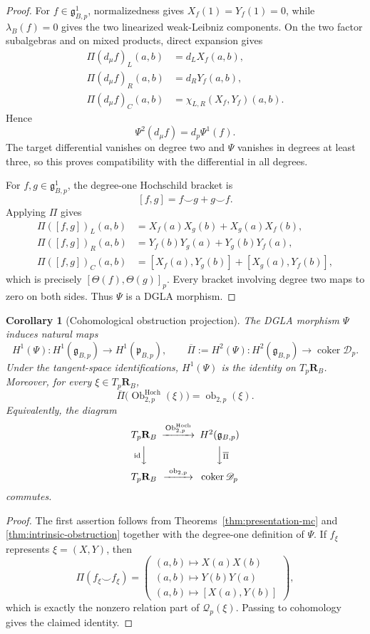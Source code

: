 \documentclass[11pt]{amsart}
\newtheorem{corollary}[theorem]{Corollary}
\newcommand{\coker}{\operatorname{coker}}
\newcommand{\cD}{\mathscr D}
\newcommand{\cQ}{\mathscr Q}
\newcommand{\gpres}{\mathfrak p}
\newcommand{\ghoch}{\mathfrak g}
\begin{document}
\begin{proof}
For $f\in\ghoch^1_{B,p}$, normalizedness gives $X_f(1)=Y_f(1)=0$, while $\lambda_B(f)=0$ gives the two linearized weak-Leibniz components.  On the two factor subalgebras and on mixed products, direct expansion gives
\begin{align*}
\Pi(d_\mu f)_L(a,b)&=d_LX_f(a,b),\\
\Pi(d_\mu f)_R(a,b)&=d_RY_f(a,b),\\
\Pi(d_\mu f)_C(a,b)&=\chi_{L,R}(X_f,Y_f)(a,b).
\end{align*}
Hence
\[
\Psi^2(d_\mu f)=d_p\Psi^1(f).
\]
The target differential vanishes on degree two and $\Psi$ vanishes in degrees at least three, so this proves compatibility with the differential in all degrees.

For $f,g\in\ghoch^1_{B,p}$, the degree-one Hochschild bracket is
\[
[f,g]=f\smile g+g\smile f.
\]
Applying $\Pi$ gives
\begin{align*}
\Pi([f,g])_L(a,b)
&=X_f(a)X_g(b)+X_g(a)X_f(b),\\
\Pi([f,g])_R(a,b)
&=Y_f(b)Y_g(a)+Y_g(b)Y_f(a),\\
\Pi([f,g])_C(a,b)
&=[X_f(a),Y_g(b)]+[X_g(a),Y_f(b)],
\end{align*}
which is precisely $[\Theta(f),\Theta(g)]_p$.  Every bracket involving degree two maps to zero on both sides.  Thus $\Psi$ is a DGLA morphism.
\end{proof}

\begin{corollary}[Cohomological obstruction projection]\label{cor:cohomological-projection}
The DGLA morphism $\Psi$ induces natural maps
\[
H^1(\Psi):H^1(\ghoch_{B,p})\longrightarrow H^1(\gpres_{B,p}),
\qquad
\overline\Pi:=H^2(\Psi):H^2(\ghoch_{B,p})\longrightarrow\coker\cD_p.
\]
Under the tangent-space identifications, $H^1(\Psi)$ is the identity on $T_p\mathbf R_B$.  Moreover, for every $\xi\in T_p\mathbf R_B$,
\[
\boxed{
\overline\Pi\bigl(\operatorname{Ob}^{\mathrm{Hoch}}_{2,p}(\xi)\bigr)
=
\operatorname{ob}_{2,p}(\xi).
}
\]
Equivalently, the diagram
\[
\begin{CD}
T_p\mathbf R_B @>{\operatorname{Ob}^{\mathrm{Hoch}}_{2,p}}>> H^2(\ghoch_{B,p})\\
@V{\mathrm{id}}VV @VV{\overline\Pi}V\\
T_p\mathbf R_B @>{\operatorname{ob}_{2,p}}>> \coker\cD_p
\end{CD}
\]
commutes.
\end{corollary}

\begin{proof}
The first assertion follows from Theorems~\ref{thm:presentation-mc} and \ref{thm:intrinsic-obstruction} together with the degree-one definition of $\Psi$.  If $f_\xi$ represents $\xi=(X,Y)$, then
\[
\Pi(f_\xi\smile f_\xi)
=
\begin{pmatrix}
(a,b)\mapsto X(a)X(b)\\
(a,b)\mapsto Y(b)Y(a)\\
(a,b)\mapsto [X(a),Y(b)]
\end{pmatrix},
\]
which is exactly the nonzero relation part of $\cQ_p(\xi)$.  Passing to cohomology gives the claimed identity.
\end{proof}
\end{document}
